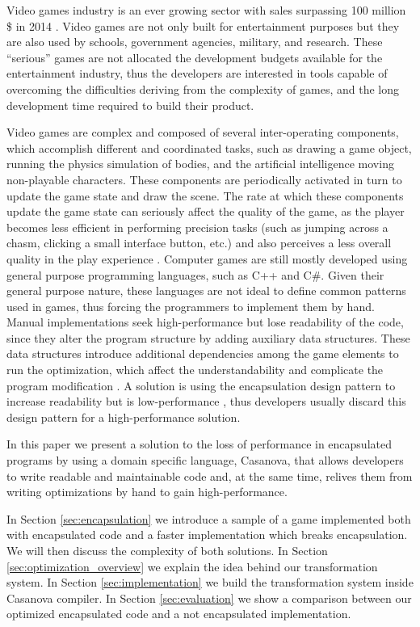 Video games industry is an ever growing sector with sales surpassing 100 million \$ in 2014 \cite{GAME_SALES}. Video games are not only built for entertainment purposes but they are also used by schools, government agencies, military, and research. These ``serious'' games are not allocated the development budgets available for the entertainment industry, thus the developers are interested in tools capable of overcoming the difficulties deriving from the complexity of games, and the long development time required to build their product.

Video games are complex and composed of several inter-operating components, which accomplish different and coordinated tasks, such as drawing a game object, running the physics simulation of bodies, and the artificial intelligence moving non-playable characters. These components are periodically activated in turn to update the game state and draw the scene. The rate at which these components update the game state can seriously affect the quality of the game, as the player becomes less efficient in performing precision tasks (such as jumping across a chasm, clicking a small interface button, etc.) and also perceives a less overall quality in the play experience \cite{FPS_RATE2, FPS_RATE1}. Computer games are still mostly developed using general purpose programming languages, such as C++ and C\#. Given their general purpose nature, these languages are not ideal to define common patterns used in games, thus forcing the programmers to implement them by hand. Manual implementations seek high-performance but lose readability of the code, since they alter the program structure by adding auxiliary data structures. These data structures introduce additional dependencies among the game elements to run the optimization, which affect the understandability and complicate the program modification \cite{ENCAPSULATION_AND_INHERITANCE_IN_OOP}. A solution is using the encapsulation design pattern to increase readability but is low-performance \cite{ENCAPSULATION_DISADVANTAGES}, thus developers usually discard this design pattern for a high-performance solution.

\vspace{0.5cm}
\noindent
In this paper we present a solution to the loss of performance in encapsulated programs by using a domain specific language, Casanova, that allows developers to write readable and maintainable code and, at the same time, relives them from writing optimizations by hand to gain high-performance.

\vspace{0.5cm}
\noindent
In Section \ref{sec:encapsulation} we introduce a sample of a game implemented both with encapsulated code and a faster implementation which breaks encapsulation. We will then discuss the complexity of both solutions. In Section \ref{sec:optimization_overview} we explain the idea behind our transformation system. In Section \ref{sec:implementation} we build the transformation system inside Casanova compiler. In Section \ref{sec:evaluation} we show a comparison between our optimized encapsulated code and a not encapsulated implementation.